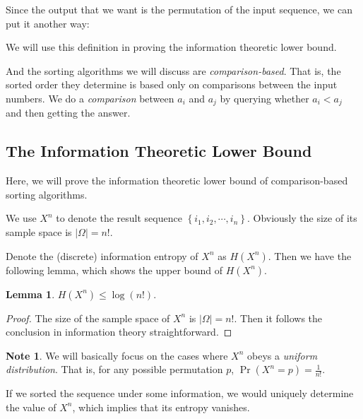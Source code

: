 \documentclass[12pt]{extarticle}
\newcommand{\<}{\langle}
\renewcommand{\>}{\rangle}
\theoremstyle{definition}
\newtheorem{lemma}{Lemma}
\newtheorem*{note}{Note}
\begin{document}
Since the output that we want is the permutation of the input sequence, we can put it another way:

\begin{algorithm}
	\label{algo:problem2}
\end{algorithm}

We will use this definition in proving the information theoretic lower bound.

And the sorting algorithms we will discuss are \textit{comparison-based}. That is, the sorted order they determine is based only on comparisons between the input numbers. We do a \textit{comparison} between $a_i$ and $a_j$ by querying whether $a_i < a_j$ and then getting the answer.

\subsection{The Information Theoretic Lower Bound}

Here, we will prove the information theoretic lower bound of comparison-based sorting algorithms. 

We use $X^n$ to denote the result sequence $\left\lbrace i_1, i_2, \cdots, i_n\right\rbrace$. Obviously the size of its sample space is $|\Omega| = n!$.  

Denote the (discrete) information entropy of $X^n$ as $H(X^n)$. Then we have the following lemma, which shows the upper bound of $H(X^n)$.

\begin{lemma}
	$H(X^n) \le \log (n!)$.
\end{lemma}
\begin{proof}
	The size of the sample space of $X^n$ is $|\Omega| = n!$. Then it follows the conclusion in information theory straightforward.
\end{proof}

\begin{note}
	We will basically focus on the cases where $X^n$ obeys a \textit{uniform distribution}. That is, for any possible permutation $p$, $\operatorname{Pr} (X^n = p) = \frac{1}{n!}$. 
\end{note}

If we sorted the sequence under some information, we would uniquely determine the value of $X^n$, which implies that its entropy vanishes.
\end{document}
